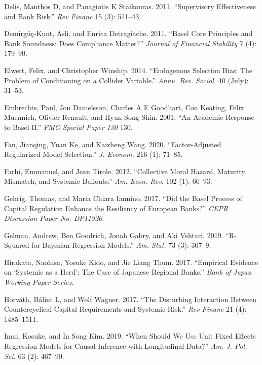 \documentclass[
  10pt,
]{article}
\begin{document}
\leavevmode\hypertarget{ref-Delis2011}{}%
Delis, Manthos D, and Panagiotis K Staikouras. 2011. ``Supervisory
Effectiveness and Bank Risk.'' \emph{Rev Financ} 15 (3): 511--43.

\leavevmode\hypertarget{ref-Demirguc-Kunt2011}{}%
Demirgüç-Kunt, Asli, and Enrica Detragiache. 2011. ``Basel Core
Principles and Bank Soundness: Does Compliance Matter?'' \emph{Journal
of Financial Stability} 7 (4): 179--90.

\leavevmode\hypertarget{ref-Elwert2014}{}%
Elwert, Felix, and Christopher Winship. 2014. ``Endogenous Selection
Bias: The Problem of Conditioning on a Collider Variable.'' \emph{Annu.
Rev. Sociol.} 40 (July): 31--53.

\leavevmode\hypertarget{ref-Embrechts2001}{}%
Embrechts, Paul, Jon Danielsson, Charles A E Goodhart, Con Keating,
Felix Muennich, Olivier Renault, and Hyun Song Shin. 2001. ``An Academic
Response to Basel II.'' \emph{FMG Special Paper 130} 130.

\leavevmode\hypertarget{ref-Fan2020}{}%
Fan, Jianqing, Yuan Ke, and Kaizheng Wang. 2020. ``Factor-Adjusted
Regularized Model Selection.'' \emph{J. Econom.} 216 (1): 71--85.

\leavevmode\hypertarget{ref-Farhi2012}{}%
Farhi, Emmanuel, and Jean Tirole. 2012. ``Collective Moral Hazard,
Maturity Mismatch, and Systemic Bailouts.'' \emph{Am. Econ. Rev.} 102
(1): 60--93.

\leavevmode\hypertarget{ref-Gehrig2017}{}%
Gehrig, Thomas, and Maria Chiara Iannino. 2017. ``Did the Basel Process
of Capital Regulation Enhance the Resiliency of European Banks?''
\emph{CEPR Discussion Paper No. DP11920}.

\leavevmode\hypertarget{ref-Gelman2019}{}%
Gelman, Andrew, Ben Goodrich, Jonah Gabry, and Aki Vehtari. 2019.
``R-Squared for Bayesian Regression Models.'' \emph{Am. Stat.} 73 (3):
307--9.

\leavevmode\hypertarget{ref-Hirakata2017}{}%
Hirakata, Naohisa, Yosuke Kido, and Jie Liang Thum. 2017. ``Empirical
Evidence on `Systemic as a Herd': The Case of Japanese Regional Banks.''
\emph{Bank of Japan Working Paper Series}.

\leavevmode\hypertarget{ref-Horvath2017}{}%
Horváth, Bálint L, and Wolf Wagner. 2017. ``The Disturbing Interaction
Between Countercyclical Capital Requirements and Systemic Risk.''
\emph{Rev Financ} 21 (4): 1485--1511.

\leavevmode\hypertarget{ref-Imai2019}{}%
Imai, Kosuke, and In Song Kim. 2019. ``When Should We Use Unit Fixed
Effects Regression Models for Causal Inference with Longitudinal Data?''
\emph{Am. J. Pol. Sci.} 63 (2): 467--90.
\end{document}

